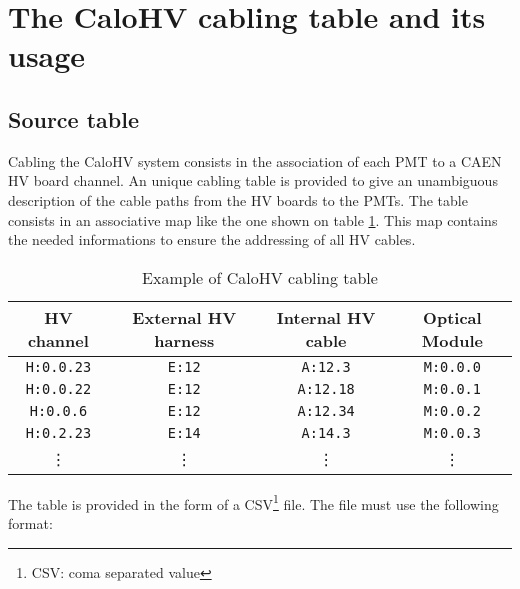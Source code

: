 
\clearpage
\section{The CaloHV cabling table and its usage}

\subsection{Source table}

Cabling the CaloHV system consists in the association of each PMT to a
CAEN HV  board channel.  An unique  cabling table is  provided to
give an unambiguous description of the  cable paths from the HV boards
to the  PMTs.  The table consists  in an associative map  like the one
shown on  table \ref{tab:calohv:map:1}.  This map contains  the needed
informations to ensure the addressing of all HV cables.

\begin{table}[h]
\begin{center}
\begin{tabular}{|c|c|c|c|}
  \hline
  \textbf{HV channel}& \textbf{External HV harness} & \textbf{Internal HV cable} & \textbf{Optical Module} \\
  \hline
  \hline
  \texttt{H:0.0.23}  & \texttt{E:12} & \texttt{A:12.3} & \texttt{M:0.0.0} \\
  \hline
  \texttt{H:0.0.22}  & \texttt{E:12} & \texttt{A:12.18} & \texttt{M:0.0.1} \\
  \hline
  \texttt{H:0.0.6}  & \texttt{E:12} & \texttt{A:12.34} & \texttt{M:0.0.2} \\
  \hline
  \texttt{H:0.2.23}  & \texttt{E:14} & \texttt{A:14.3} & \texttt{M:0.0.3} \\
  \hline
  \vdots          & \vdots  & \vdots   & \vdots             \\  
  \hline
\end{tabular}
\end{center}
\caption{Example of CaloHV cabling table}
\label{tab:calohv:map:1}
\end{table}

\par\noindent The table is provided in the form of a CSV\footnote{CSV:
  coma separated value} file.  The file must use the following format:

